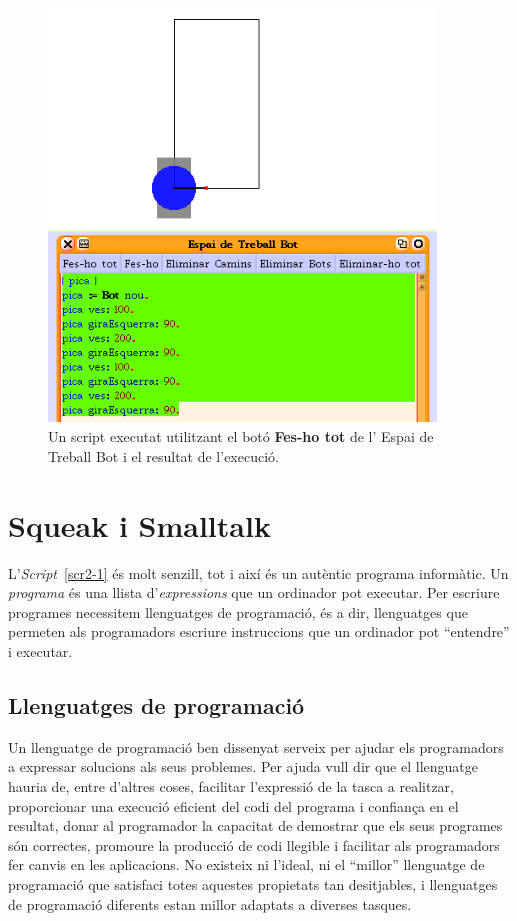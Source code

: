 \begin{figure}[h]
\begin{center}
\includegraphics[height=110mm ,width=103mm ]{Imatges/figura2-3.png}
\end{center}
\caption{Un script executat utilitzant el botó \textbf{\upshape Fes-ho tot} de l' \textsf{\upshape Espai de Treball Bot} i el resultat de l'execució.}
\label{fig0203}
\end{figure}

\section{Squeak i Smalltalk}
 
L'\emph{Script}~\ref{scr2-1} és molt senzill, tot i així és un autèntic programa informàtic. Un \emph{programa} és una llista d'\emph{expressions} que un ordinador pot executar. Per escriure programes necessitem llenguatges de programació, és a dir, llenguatges que permeten als programadors escriure instruccions que un ordinador pot ``entendre'' i executar.

\subsection{Llenguatges de programació}
Un llenguatge de programació ben dissenyat serveix per ajudar els programadors a expressar solucions als seus problemes. Per ajuda vull dir que el llenguatge hauria de, entre d'altres coses, facilitar l'expressió de la tasca a realitzar, proporcionar una execució eficient del codi del programa i confiança en el resultat, donar al programador la capacitat de demostrar que els seus programes són correctes, promoure la producció de codi llegible i facilitar als programadors fer canvis en les aplicacions. No existeix ni l'ideal, ni el ``millor'' llenguatge de programació que satisfaci totes aquestes propietats tan desitjables, i llenguatges de programació diferents estan millor adaptats a diverses tasques.

